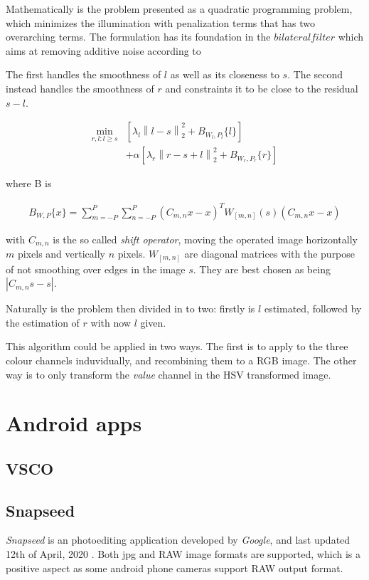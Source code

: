 \documentclass{IEEEtran}
\newcommand{\norm}[1]{\left\lVert#1\right\rVert}
\begin{document}
Mathematically is the problem presented as a quadratic programming problem, which minimizes the illumination with penalization terms that has two overarching terms. The formulation has its foundation in the $bilateral filter$ which aims at removing additive noise according to %

 The first handles the smoothness of $l$ as well as its closeness to $s$. The second instead handles the smoothness of $r$ and constraints it to be close to the residual $s - l$.

\begin{align}
  \min_{r, l: l \geq s} & \left[ \lambda_l \norm{l-s}_2^2 + B_{W_l, P_l}\{l\} \right ] \\
  & + \alpha \left [\lambda_r \norm{r-s+l}_2^2 + B_{W_r, P_r}\{r\} \right] \nonumber
\end{align}

where B is

\begin{align}
  B_{W, P}\{x\} = \sum_{m=-P}^{P}\sum_{n=-P}^{P}(C_{m,n}x-x)^T W_{[m,n]}(s) (C_{m,n}x-x)
\end{align}

with $C_{m,n}$ is the so called \emph{shift operator}, moving the operated image horizontally $m$ pixels and vertically $n$ pixels. $W_{[m,n]}$ are diagonal matrices with the purpose of not smoothing over edges in the image $s$. They are best chosen as being $|C_{m,n}s - s |$.

Naturally is the problem then divided in to two: firstly is $l$ estimated, followed by the estimation of $r$ with now $l$ given.

This algorithm could be applied in two ways. The first is to apply to the three colour channels induvidually, and recombining them to a RGB image. The other way is to only transform the \emph{value} channel in the HSV transformed image.

\section{Android apps}

\subsection{VSCO}
\subsection{Snapseed}
\emph{Snapseed} is an photoediting application developed by \emph{Google}, and last updated 12th of April, 2020 \cite{snapseed}. Both jpg and RAW image formats are supported, which is a positive aspect as some android phone cameras support RAW output format.
\end{document}
